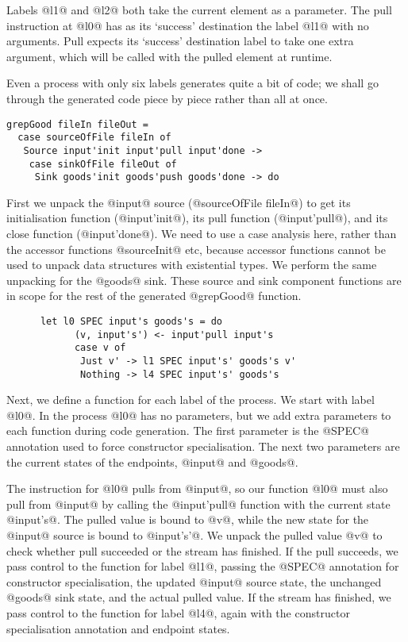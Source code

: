 Labels @l1@ and @l2@ both take the current element as a parameter.
The pull instruction at @l0@ has as its `success' destination the label @l1@ with no arguments.
Pull expects its `success' destination label to take one extra argument, which will be called with the pulled element at runtime.

Even a process with only six labels generates quite a bit of code; we shall go through the generated code piece by piece rather than all at once.

\begin{lstlisting}
grepGood fileIn fileOut =
  case sourceOfFile fileIn of
   Source input'init input'pull input'done ->
    case sinkOfFile fileOut of
     Sink goods'init goods'push goods'done -> do
\end{lstlisting}

First we unpack the @input@ source (@sourceOfFile fileIn@) to get its initialisation function (@input'init@), its pull function (@input'pull@), and its close function (@input'done@).
We need to use a case analysis here, rather than the accessor functions @sourceInit@ etc, because accessor functions cannot be used to unpack data structures with existential types.
We perform the same unpacking for the @goods@ sink.
These source and sink component functions are in scope for the rest of the generated @grepGood@ function.

\begin{lstlisting}
      let l0 SPEC input's goods's = do
            (v, input's') <- input'pull input's
            case v of
             Just v' -> l1 SPEC input's' goods's v'
             Nothing -> l4 SPEC input's' goods's
\end{lstlisting}

Next, we define a function for each label of the process.
We start with label @l0@.
In the process @l0@ has no parameters, but we add extra parameters to each function during code generation.
The first parameter is the @SPEC@ annotation used to force constructor specialisation.
The next two parameters are the current states of the endpoints, @input@ and @goods@.

The instruction for @l0@ pulls from @input@, so our function @l0@ must also pull from @input@ by calling the @input'pull@ function with the current state @input's@.
The pulled value is bound to @v@, while the new state for the @input@ source is bound to @input's'@.
We unpack the pulled value @v@ to check whether pull succeeded or the stream has finished.
If the pull succeeds, we pass control to the function for label @l1@, passing the @SPEC@ annotation for constructor specialisation, the updated @input@ source state, the unchanged @goods@ sink state, and the actual pulled value.
If the stream has finished, we pass control to the function for label @l4@, again with the constructor specialisation annotation and endpoint states.


